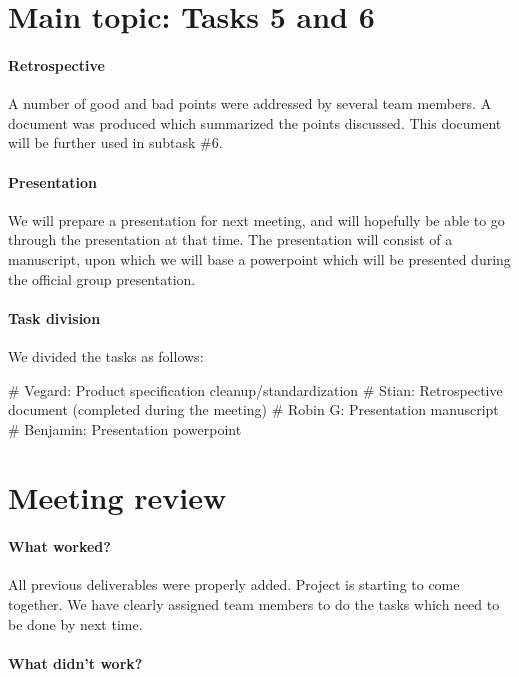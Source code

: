 \documentclass{article}
\begin{document}
\section{Main topic: Tasks 5 and 6}

\paragraph{Retrospective}

A number of good and bad points were addressed by several team members. A document was produced which summarized the points discussed. This document will be further used in subtask \#6.

\paragraph{Presentation}

We will prepare a presentation for next meeting, and will hopefully be able to go through the presentation at that time. The presentation will consist of a manuscript, upon which we will base a powerpoint which will be presented during the official group presentation.

\paragraph{Task division}

We divided the tasks as follows:
\begin{easylist}[itemize]
    # Vegard: Product specification cleanup/standardization
    # Stian: Retrospective document (completed during the meeting)
    # Robin G: Presentation manuscript
    # Benjamin: Presentation powerpoint
\end{easylist}

\section{Meeting review}

\paragraph{What worked?}

All previous deliverables were properly added. Project is starting to come together. We have clearly assigned team members to do the tasks which need to be done by next time.

\paragraph{What didn't work?}
\end{document}
